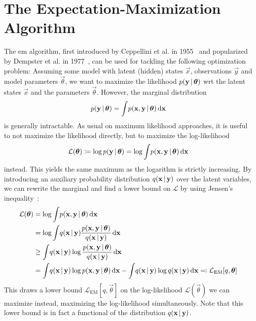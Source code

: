 	\section{The Expectation-Maximization Algorithm}
		The \ac{em} algorithm, first introduced by Ceppellini et al. in 1955~\cite{ceppelliniEstimationGeneFrequencies1955} and popularized by Dempster et al. in 1977~\cite{dempsterMaximumLikelihoodIncomplete1977}, can be used for tackling the following optimization problem: Assuming some model with latent (hidden) states \(\vec{x}\), observations \(\vec{y}\) and model parameters \(\vec{\theta}\), we want to maximize the likelihood \( p(\boldsymbol{\mathrm{y}} \,\vert\, \boldsymbol{\mathrm{\theta}}) \) \ac{wrt} the latent states \(\vec{x}\) and the parameters \(\vec{\theta}\). However, the marginal distribution
		\begin{align*}
			p(\boldsymbol{\mathrm{y}} \,\vert\, \boldsymbol{\mathrm{\theta}}) = \int\! p(\boldsymbol{\mathrm{x}}, \boldsymbol{\mathrm{y}} \,\vert\, \boldsymbol{\mathrm{\theta}}) \dd{\boldsymbol{\mathrm{x}}}
		\end{align*}
		is generally intractable. As usual on maximum likelihood approaches, it is useful to not maximize the likelihood directly, but to maximize the log-likelihood
		\begin{align*}
			\mathcal{L}(\boldsymbol{\mathrm{\theta}}) \coloneqq \log p(\boldsymbol{\mathrm{y}} \,\vert\, \boldsymbol{\mathrm{\theta}}) = \log \int\! p(\boldsymbol{\mathrm{x}}, \boldsymbol{\mathrm{y}} \,\vert\, \boldsymbol{\mathrm{\theta}}) \dd{\boldsymbol{\mathrm{x}}}
		\end{align*}
		instead. This yields the same maximum as the logarithm is strictly increasing. By introducing an auxiliary probability distribution \( q(\boldsymbol{\mathrm{x}} \,\vert\, \boldsymbol{\mathrm{y}}) \) over the latent variables, we can rewrite the marginal and find a lower bound on \(\mathcal{L}\) by using Jensen's inequality~\cite{jensenFonctionsConvexesInegalites1906}:
		\begin{align}
			\mathcal{L}(\boldsymbol{\mathrm{\theta}})
				&= \log \int\! p(\boldsymbol{\mathrm{x}}, \boldsymbol{\mathrm{y}} \,\vert\, \boldsymbol{\mathrm{\theta}}) \dd{\boldsymbol{\mathrm{x}}}  \nonumber \\
				&= \log \int\! q(\boldsymbol{\mathrm{x}} \,\vert\, \boldsymbol{\mathrm{y}}) \frac{p(\boldsymbol{\mathrm{x}}, \boldsymbol{\mathrm{y}} \,\vert\, \boldsymbol{\mathrm{\theta}})}{q(\boldsymbol{\mathrm{x}} \,\vert\, \boldsymbol{\mathrm{y}})} \dd{\boldsymbol{\mathrm{x}}}  \nonumber \\
				&\geq \int\! q(\boldsymbol{\mathrm{x}} \,\vert\, \boldsymbol{\mathrm{y}}) \log \frac{p(\boldsymbol{\mathrm{x}}, \boldsymbol{\mathrm{y}} \,\vert\, \boldsymbol{\mathrm{\theta}})}{q(\boldsymbol{\mathrm{x}} \,\vert\, \boldsymbol{\mathrm{y}})} \dd{\boldsymbol{\mathrm{x}}}  \nonumber \\
				&= \int\! q(\boldsymbol{\mathrm{x}} \,\vert\, \boldsymbol{\mathrm{y}}) \log p(\boldsymbol{\mathrm{x}}, \boldsymbol{\mathrm{y}} \,\vert\, \boldsymbol{\mathrm{\theta}}) \dd{\boldsymbol{\mathrm{x}}} - \int\! q(\boldsymbol{\mathrm{x}} \,\vert\, \boldsymbol{\mathrm{y}}) \log q(\boldsymbol{\mathrm{x}} \,\vert\, \boldsymbol{\mathrm{y}}) \dd{\boldsymbol{\mathrm{x}}} \eqqcolon \mathcal{L}_\mathrm{EM}[q, \boldsymbol{\mathrm{\theta}}]  \label{eq:emLowerBound}
		\end{align}
		This draws a lower bound \( \mathcal{L}_\mathrm{EM}[q, \vec{\theta}] \) on the log-likelihood \( \mathcal{L}(\vec{\theta}) \) we can maximize instead, maximizing the log-likelihood simultaneously. Note that this lower bound is in fact a functional of the distribution \( q(\boldsymbol{\mathrm{x}} \,\vert\, \boldsymbol{\mathrm{y}}) \).

